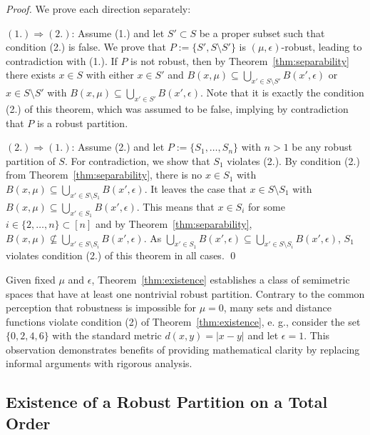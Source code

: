 \begin{proof}
    We prove each direction separately:

    $(1.) \Rightarrow (2.)$:
    Assume (1.) and let $S' \subset S$ be a proper subset such that condition (2.) is false. We prove that $P := \{S', S\setminus S'\}$ is $(\mu, \epsilon)$-robust, leading to contradiction with (1.). If $P$ is not robust, then by Theorem~\ref{thm:separability} there exists $x \in S$ with either $x \in S'$ and $B(x, \mu) \subseteq \bigcup_{x' \in S \setminus S'} B(x', \epsilon)$ or $x \in S \setminus S'$ with $B(x,\mu) \subseteq \bigcup_{x' \in S'} B(x', \epsilon)$. Note that it is exactly the condition (2.) of this theorem, which was assumed to be false, implying by contradiction that $P$ is a robust partition.

    $(2.) \Rightarrow (1.)$:
    Assume (2.) and let $P := \{S_1, \dots, S_n\}$ with $n > 1$ be any robust partition of $S$. For contradiction, we show that $S_1$ violates (2.). By condition (2.) from Theorem~\ref{thm:separability}, there is no $x \in S_1$ with $B(x, \mu) \subseteq \bigcup_{x' \in S \setminus S_1} B(x', \epsilon)$. It leaves the case that $x \in S \setminus S_1$ with $B(x,\mu) \subseteq \bigcup_{x' \in S_1} B(x', \epsilon)$. This means that $x \in S_i$ for some $ i \in \{2,\dots,n\} \subset [n]$ and by Theorem~\ref{thm:separability}, $B(x, \mu) \not\subseteq \bigcup_{x' \in S\setminus S_i} B(x', \epsilon)$. As $\bigcup_{x' \in S_1} B(x', \epsilon) \subseteq \bigcup_{x' \in S\setminus S_i} B(x', \epsilon)$, $S_1$ violates condition (2.) of this theorem in all cases.
    \qed
\end{proof}

Given fixed $\mu$ and $\epsilon$, Theorem~\ref{thm:existence} establishes a class of semimetric spaces that have at least one nontrivial robust partition. Contrary to the common perception that robustness is impossible for $\mu = 0$, many sets and distance functions violate condition (2) of Theorem~\ref{thm:existence}, e. g., consider the set $\{0,2,4,6\}$ with the standard metric $d(x,y) = |x - y|$ and let $\epsilon = 1$. This observation demonstrates benefits of providing mathematical clarity by replacing informal arguments with rigorous analysis.

\subsection{Existence of a Robust Partition on a Total Order}
\label{subsec:existence-order}

